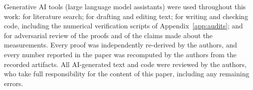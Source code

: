 Generative AI tools (large language model assistants) were used throughout
this work: for literature search; for drafting and editing text; for writing
and checking code, including the numerical verification scripts of
Appendix~\ref{app:audits}; and for adversarial review of the proofs and of
the claims made about the measurements. Every proof was independently
re-derived by the authors, and every number reported in the paper was
recomputed by the authors from the recorded artifacts. All AI-generated text
and code were reviewed by the authors, who take full responsibility for the
content of this paper, including any remaining errors.
